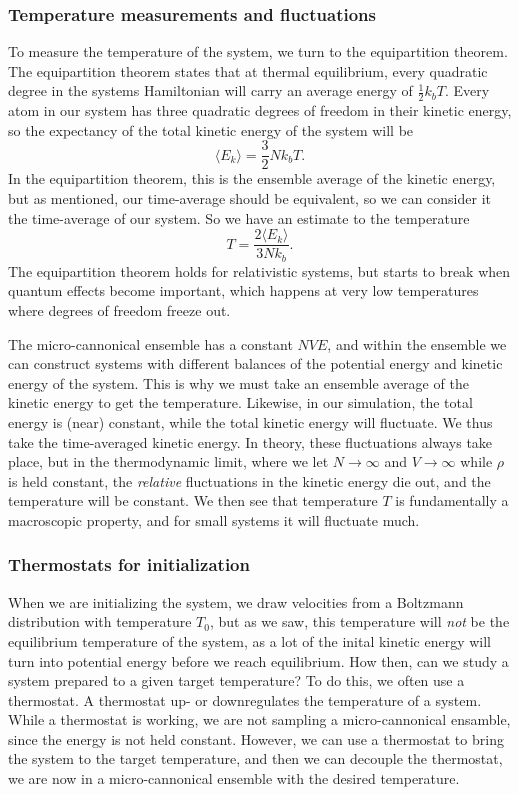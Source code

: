 \documentclass[a4paper, 11pt, notitlepage, english]{article}
\begin{document}
\clearpage 

\subsubsection*{Temperature measurements and fluctuations}

To measure the temperature of the system, we turn to the equipartition theorem. The equipartition theorem states that at thermal equilibrium, every quadratic degree in the systems Hamiltonian will carry an average energy of $\frac{1}{2}k_b T$. Every atom in our system has three quadratic degrees of freedom in their kinetic energy, so the expectancy of the total kinetic energy of the system will be 
$$\langle E_k \rangle = \frac{3}{2}Nk_bT.$$
In the equipartition theorem, this is the ensemble average of the kinetic energy, but as mentioned, our time-average should be equivalent, so we can consider it the time-average of our system. So we have an estimate to the temperature
$$T = \frac{2\langle E_k \rangle}{3Nk_b}.$$
The equipartition theorem holds for relativistic systems, but starts to break when quantum effects become important, which happens at very low temperatures where degrees of freedom freeze out.

The micro-cannonical ensemble has a constant $NVE$, and within the ensemble we can construct systems with different balances of the potential energy and kinetic energy of the system. This is why we must take an ensemble average of the kinetic energy to get the temperature. Likewise, in our simulation, the total energy is (near) constant, while the total kinetic energy will fluctuate. We thus take the time-averaged kinetic energy. In theory, these fluctuations always take place, but in the thermodynamic limit, where we let $N\to \infty$ and $V\to \infty$ while $\rho$ is held constant, the \emph{relative} fluctuations in the kinetic energy die out, and the temperature will be constant. We then see that temperature $T$ is fundamentally a macroscopic property, and for small systems it will fluctuate much.

\subsubsection*{Thermostats for initialization}

When we are initializing the system, we draw velocities from a Boltzmann distribution with temperature $T_0$, but as we saw, this temperature will \emph{not} be the equilibrium temperature of the system, as a lot of the inital kinetic energy will turn into potential energy before we reach equilibrium. How then, can we study a system prepared to a given target temperature? To do this, we often use a thermostat. A thermostat up- or downregulates the temperature of a system. While a thermostat is working, we are not sampling a micro-cannonical ensamble, since the energy is not held constant. However, we can use a thermostat to bring the system to the target temperature, and then we can decouple the thermostat, we are now in a micro-cannonical ensemble with the desired temperature. 
\end{document}
